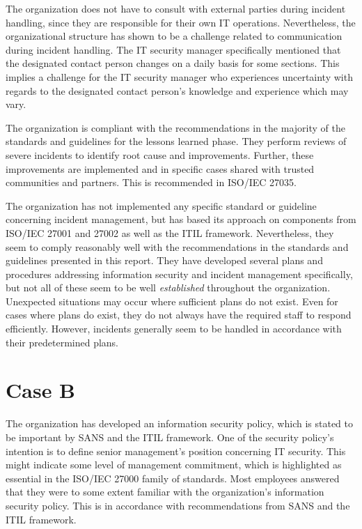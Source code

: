 The organization does not have to consult with external parties during incident handling, since they are responsible for their own IT operations. Nevertheless, the organizational structure has shown to be a challenge related to communication during incident handling. The IT security manager specifically mentioned that the designated contact person changes on a daily basis for some sections. This implies a challenge for the IT security manager who experiences uncertainty with regards to the designated contact person's knowledge and experience which may vary.

The organization is compliant with the recommendations in the majority of the standards and guidelines for the lessons learned phase. They perform reviews of severe incidents to identify root cause and improvements. Further, these improvements are implemented and in specific cases shared with trusted communities and partners. This is recommended in ISO/IEC 27035. 

The organization has not implemented any specific standard or guideline concerning incident management, but has based its approach on components from ISO/IEC 27001 and 27002 as well as the \ac{ITIL} framework. Nevertheless, they seem to comply reasonably well with the recommendations in the standards and guidelines presented in this report. They have developed several plans and procedures addressing information security and incident management specifically, but not all of these seem to be well \textit{established} throughout the organization. Unexpected situations may occur where sufficient plans do not exist. Even for cases where plans do exist, they do not always have the required staff to respond efficiently. However, incidents generally seem to be handled in accordance with their predetermined plans.


\section{Case B}
The organization has developed an information security policy, which is stated to be important by SANS and the ITIL framework. One of the security policy's intention is to define senior management's position concerning IT security. This might indicate some level of management commitment, which is highlighted as essential in the ISO/IEC 27000 family of standards. Most employees answered that they were to some extent familiar with the organization's information security policy. This is in accordance with recommendations from SANS and the ITIL framework. 

